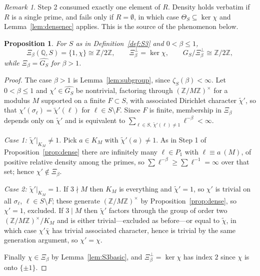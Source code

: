 \documentclass[11pt]{amsart}
\numberwithin{equation}{section}
\newtheorem{proposition}[theorem]{Proposition}
\theoremstyle{definition}
\theoremstyle{remark}
\newtheorem{remark}[theorem]{Remark}
\newcommand{\Z}{\mathbb{Z}}
\newcommand{\Q}{\mathbb{Q}}
\begin{document}
\begin{remark}\label{rem:onewitness}
Step 2 consumed exactly one element of $R$. Density holds verbatim if $R$ is a
single prime, and fails only if $R=\emptyset$, in which case
$\Theta_S\subseteq\ker\chi$ and Lemma~\ref{lem:densenec} applies. This is the
source of the phenomenon below.
\end{remark}

\begin{proposition}\label{prop:Xiexact}
For $S$ as in Definition~\ref{def:S3} and $0<\beta\le1$,
\[
\Xi_\beta(\Q,S)=\{1,\chi\}\cong\Z/2\Z,\qquad\Xi_\beta^\perp=\ker\chi,\qquad
G_S/\Xi_\beta^\perp\cong\Z/2\Z ,
\]
while $\Xi_\beta=\widehat{G_S}$ for $\beta>1$.
\end{proposition}

\begin{proof}
The case $\beta>1$ is Lemma~\ref{lem:subgroup}, since $\zeta_S(\beta)<\infty$.
Let $0<\beta\le1$ and $\chi'\in\widehat{G_S}$ be nontrivial, factoring through
$(\Z/M\Z)^\times$ for a modulus $M$ supported on a finite $F\subset S$, with
associated Dirichlet character $\tilde\chi'$, so that
$\chi'(\sigma_\ell)=\tilde\chi'(\ell)$ for $\ell\in S\setminus F$. Since
$F$ is finite, membership in $\Xi_\beta$ depends only on $\tilde\chi'$ and is
equivalent to $\sum_{\ell\in S,\ \tilde\chi'(\ell)\neq1}\ell^{-\beta}<\infty$.

\emph{Case 1: $\tilde\chi'|_{K_M}\neq1$.} Pick $a\in K_M$ with
$\tilde\chi'(a)\neq1$. As in Step 1 of Proposition~\ref{prop:dense} there are
infinitely many $\ell\in P_1$ with $\ell\equiv a\ (M)$, of positive relative
density among the primes, so $\sum\ell^{-\beta}\ge\sum\ell^{-1}=\infty$ over
that set; hence $\chi'\notin\Xi_\beta$.

\emph{Case 2: $\tilde\chi'|_{K_M}=1$.} If $3\nmid M$ then $K_M$ is everything
and $\tilde\chi'=1$, so $\chi'$ is trivial on all $\sigma_\ell$,
$\ell\in S\setminus F$; these generate $(\Z/M\Z)^\times$ by
Proposition~\ref{prop:dense}, so $\chi'=1$, excluded. If $3\mid M$ then
$\tilde\chi'$ factors through the group of order two $(\Z/M\Z)^\times/K_M$ and
is either trivial---excluded as before---or equal to $\tilde\chi$, in which case
$\chi'\bar\chi$ has trivial associated character, hence is trivial by the same
generation argument, so $\chi'=\chi$.

Finally $\chi\in\Xi_\beta$ by Lemma~\ref{lem:S3basic}, and $\Xi_\beta^\perp=\ker\chi$
has index $2$ since $\chi$ is onto $\{\pm1\}$.
\end{proof}
\end{document}
